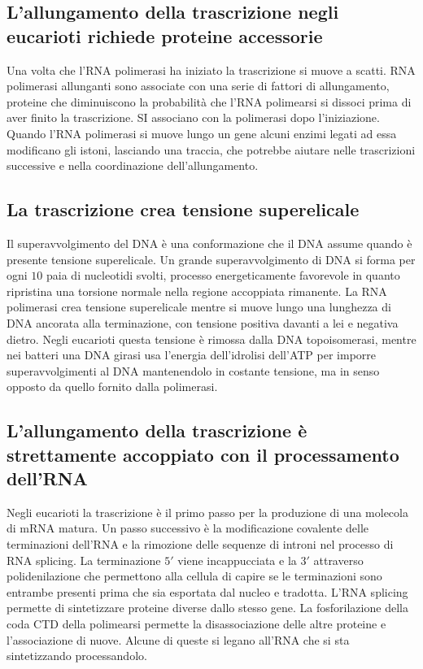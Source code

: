 \subsection{L'allungamento della trascrizione negli eucarioti richiede proteine accessorie}
Una volta che l'RNA polimerasi ha iniziato la trascrizione si muove a scatti. RNA polimerasi allunganti sono associate con una serie di fattori di allungamento, proteine che diminuiscono
la probabilit\`a che l'RNA polimearsi si dissoci prima di aver finito la trascrizione. SI associano con la polimerasi dopo l'iniziazione. Quando l'RNA polimerasi si muove lungo un gene
alcuni enzimi legati ad essa modificano gli istoni, lasciando una traccia, che potrebbe aiutare nelle trascrizioni successive e nella coordinazione dell'allungamento.
\subsection{La trascrizione crea tensione superelicale}
Il superavvolgimento del DNA \`e una conformazione che il DNA assume quando \`e presente tensione superelicale. Un grande superavvolgimento di DNA si forma per ogni $10$ paia di 
nucleotidi svolti, processo energeticamente favorevole in quanto ripristina una torsione normale nella regione accoppiata rimanente. La RNA polimerasi crea tensione superelicale mentre
si muove lungo una lunghezza di DNA ancorata alla terminazione, con tensione positiva davanti a lei e negativa dietro. Negli eucarioti questa tensione \`e rimossa dalla DNA 
topoisomerasi, mentre nei batteri una DNA girasi usa l'energia dell'idrolisi dell'ATP per imporre superavvolgimenti al DNA mantenendolo in costante tensione, ma in senso opposto da 
quello fornito dalla polimerasi. 
\subsection{L'allungamento della trascrizione \`e strettamente accoppiato con il processamento dell'RNA}
Negli eucarioti la trascrizione \`e il primo passo per la produzione di una molecola di mRNA matura. Un passo successivo \`e la modificazione covalente delle terminazioni dell'RNA e 
la rimozione delle sequenze di introni nel processo di RNA splicing. La terminazione $5'$ viene incappucciata e la $3'$ attraverso polidenilazione che permettono alla cellula di capire
se le terminazioni sono entrambe presenti prima che sia esportata dal nucleo e tradotta. L'RNA splicing permette di sintetizzare proteine diverse dallo stesso gene. La fosforilazione
della coda CTD della polimearsi permette la disassociazione delle altre proteine e l'associazione di nuove. Alcune di queste si legano all'RNA che si sta sintetizzando processandolo. 
